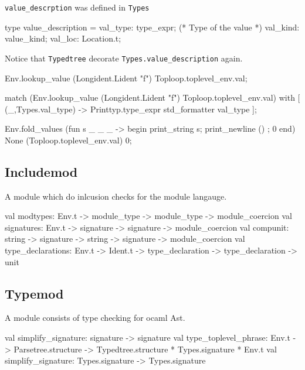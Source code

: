 \verb|value_descrption| was defined in \verb|Types|


\begin{ocamlcode}
type value_description =
  { val_type: type_expr;                (* Type of the value *)
    val_kind: value_kind;
    val_loc: Location.t;
   }
\end{ocamlcode}

Notice that \verb|Typedtree| decorate \verb|Types.value_description|
again.
\begin{ocamlcode}
Env.lookup_value (Longident.Lident "f") Toploop.toplevel_env.val;
\end{ocamlcode}

\begin{ocamlcode}
match (Env.lookup_value (Longident.Lident "f") Toploop.toplevel_env.val) with
[ (_,{Types.val_type})  -> Printtyp.type_expr std_formatter val_type ];
\end{ocamlcode}


\begin{ocamlcode}
Env.fold_values 
  (fun s _ _ _ ->
    begin print_string s; print_newline () ; 0 end)
   None (Toploop.toplevel_env.val) 0;
\end{ocamlcode}


\subsection{Includemod}
A module which do inlcusion checks for the module langauge.


\begin{ocamlcode}
val modtypes: Env.t -> module_type -> module_type -> module_coercion
val signatures: Env.t -> signature -> signature -> module_coercion
val compunit: string -> signature -> string -> signature -> module_coercion
val type_declarations:
      Env.t -> Ident.t -> type_declaration -> type_declaration -> unit
\end{ocamlcode}


\subsection{Typemod}
A module consists of type checking for ocaml Ast.
\begin{ocamlcode}
val simplify_signature: signature -> signature
val type_toplevel_phrase:
        Env.t -> Parsetree.structure ->
         Typedtree.structure * Types.signature * Env.t
val simplify_signature:
  Types.signature -> Types.signature
\end{ocamlcode}

